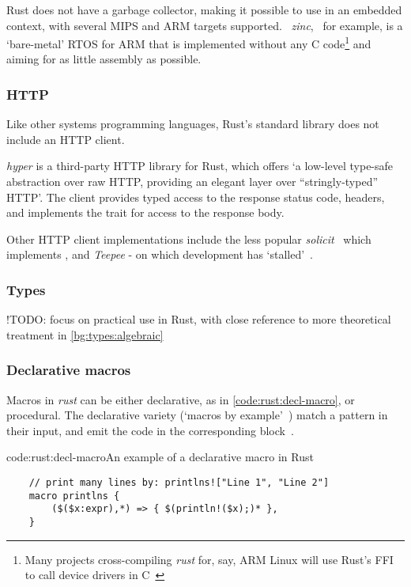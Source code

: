 Rust does not have a garbage collector, making it possible to use in an embedded context, with several MIPS and ARM targets supported.~\cite{rust_platforms} \emph{zinc},~\cite{rust_rtos_zinc} for example, is a `bare-metal' RTOS for ARM that is implemented without any C code\footnote{Many projects cross-compiling \emph{rust} for, say, ARM Linux will use Rust's FFI to call device drivers in C~\cite{rust_baremetal}} and aiming for as little assembly as possible.

\subsubsection{HTTP} \label{bg:rust:http}
Like other systems programming languages, Rust's standard library does not include an HTTP client.

\emph{hyper} is a third-party HTTP library for Rust, which offers `a low-level type-safe abstraction over raw HTTP, providing an elegant layer over ``stringly-typed'' HTTP'. The client provides typed access to the response status code, headers, and implements the  trait for access to the response body. \cite{rust_http_hyper}

Other HTTP client implementations include the less popular \emph{solicit}~\cite{rust_http_solicit} which implements , and \emph{Teepee} - on which development has `stalled'~\cite{rust_http_teepee}.

\subsubsection{Types} \label{bg:rust:types}

!TODO: focus on practical use in Rust, with close reference to more theoretical treatment in \cref{bg:types:algebraic}

\subsubsection{Declarative macros} \label{bg:rust:decl-macros}
Macros in \emph{rust} can be either declarative, as in \cref{code:rust:decl-macro}, or procedural. The declarative variety (`macros by example'~\cite{macro_by_example}) match a pattern in their input, and emit the code in the corresponding block~\cite{rust_macros_overview}.

\begin{codelisting}{code:rust:decl-macro}{An example of a declarative macro in Rust}
\begin{spacing}{\codespacing}
\begin{verbatim}
	// print many lines by: printlns!["Line 1", "Line 2"]
	macro printlns {
		($($x:expr),*) => { $(println!($x);)* },
	}
\end{verbatim}
\end{spacing}
\end{codelisting}

